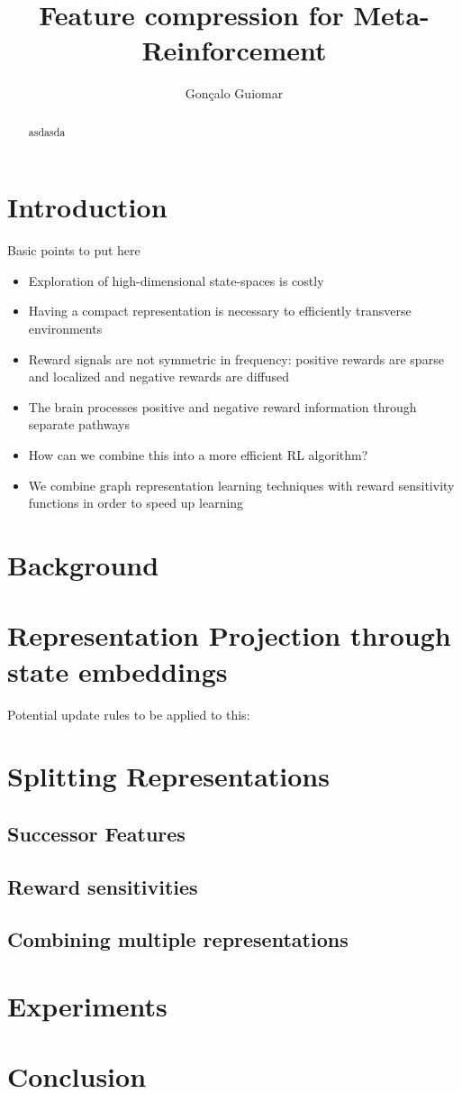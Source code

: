 \documentclass{article}
\title{Feature compression for Meta-Reinforcement}
\author{
  Gonçalo Guiomar \\
}
\begin{document}
\maketitle

\begin{abstract}
  asdasda
\end{abstract}

\section{Introduction}

Basic points to put here

\begin{itemize}
  \item Exploration of high-dimensional state-spaces is costly
  \item Having a compact representation is necessary to efficiently transverse environments
  \item Reward signals are not symmetric in frequency: positive rewards are sparse and localized and negative rewards are diffused
  \item The brain processes positive and negative reward information through separate pathways
  \item How can we combine this into a more efficient RL algorithm?
  \item We combine graph representation learning techniques with reward sensitivity functions in order to speed up learning
\end{itemize}

\section{Background}

\section{Representation Projection through state embeddings}

Potential update rules to be applied to this:


\section{Splitting Representations}
\subsection{Successor Features}
\subsection{Reward sensitivities}
\subsection{Combining multiple representations}


\section{Experiments}

\section{Conclusion}

% 
% 
\end{document}
